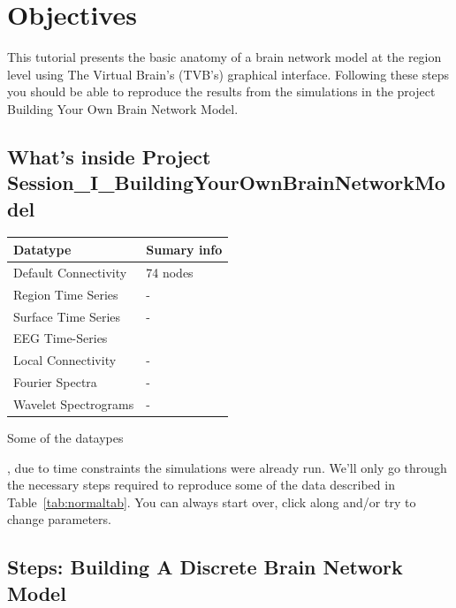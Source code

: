 \documentclass{tufte-handout}
\begin{document}
\section{Objectives}\label{sec:objectives}

This tutorial presents the basic anatomy of a brain network model at the region level using The
Virtual Brain's (TVB's) graphical interface. Following these steps you should
be able to reproduce the results from the simulations in the project Building
Your Own Brain Network Model.

\subsection{What's inside Project Session\_I\_BuildingYourOwnBrainNetworkModel}\label{sec:project_data}

\begin{margintable}
  \centering
  \selectfont
  \begin{tabular}{ll}
    \toprule
    Datatype & Sumary info                       \\
    \midrule
    Default Connectivity & 74 {nodes}            \\
    Region Time Series   & -                     \\
    Surface Time Series  & -                     \\ 
    EEG Time-Series      &                       \\
    Local Connectivity   & -                     \\
    Fourier Spectra      & -                     \\ 
    Wavelet Spectrograms & -                     \\
    \bottomrule
  \end{tabular}
  \caption{Some of the dataypes}
  \label{tab:normaltab}
\end{margintable}


, due to time constraints the simulations were
already run. We'll only go through the necessary steps required to reproduce
some of the data described in Table~\ref{tab:normaltab}. You can always start
over, click along and/or try to change parameters.


\subsection{Steps: Building A Discrete Brain Network Model}\label{sec:steps}
\end{document}
